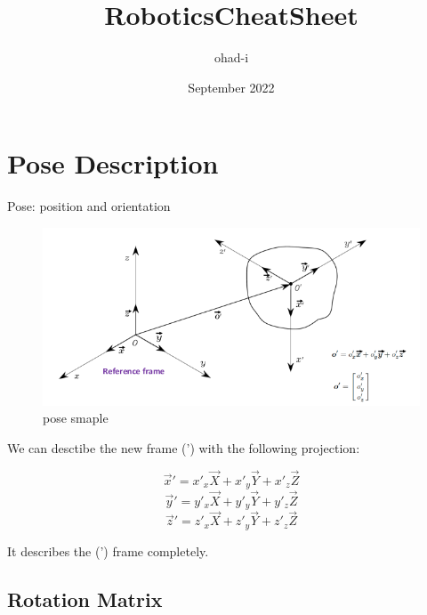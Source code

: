 \documentclass{article}
\title{RoboticsCheatSheet}
\author{ohad-i}
\date{September 2022}
\begin{document}
\section{Pose Description}
Pose: position and orientation
\begin{figure}[h!]
\centering
\includegraphics[scale=1.5]{pose.png}
\caption{pose smaple}
\label{fig:sr}
\end{figure}

We can desctibe the new frame (') with the following projection:

 $$\vec{x}{'}= x{'}_{x}\vec{X} + x{'}_{y}\vec{Y}  + x{'}_{z}\vec{Z}$$
 $$\vec{y}{'}= y{'}_{x}\vec{X} + y{'}_{y}\vec{Y}  + y{'}_{z}\vec{Z}$$
 $$\vec{z}{'}= z{'}_{x}\vec{X} + z{'}_{y}\vec{Y}  + z{'}_{z}\vec{Z}$$

It describes the (') frame completely.

\subsection{Rotation Matrix}
\end{document}

